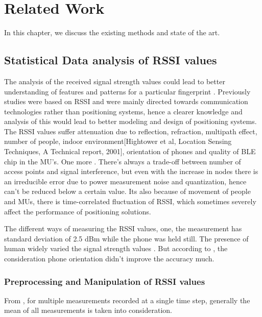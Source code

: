 \section{Related Work}
In this chapter, we discuss the existing methods and state of the art.

\subsection{Statistical Data analysis of RSSI values}
The analysis of the received signal strength values could lead to better understanding of features and patterns for a particular fingerprint . Previously studies were based on RSSI and were mainly directed towards communication technologies rather than positioning systems, hence a clearer knowledge and analysis of this would lead to better modeling and design of positioning systems\cite{kaemar}. The RSSI values suffer attenuation due to reflection, refraction, multipath effect, number of people, indoor environment[Hightower et al, Location Sensing Techniques, A Technical report, 2001], orientation of phones and quality of BLE chip in the MU's. One more  \cite{deluca}. There's always a trade-off between number of access points and signal interference, but even with the increase in nodes there is an irreducible error due to power measurement noise and quantization, hence can't be reduced below a certain value. Its also because of movement of people and MUs, there is time-correlated fluctuation of RSSI, which sometimes severely affect the performance of positioning solutions\cite{kaemar}.

The different ways of measuring the RSSI values, one, the measurement has standard deviation of 2.5 dBm while the phone was held still. The presence of human widely varied the signal strength values . But according to \cite{kaemar}, the consideration phone orientation didn't improve the accuracy much. 

\subsubsection{Preprocessing and Manipulation of RSSI values}
From \cite{honkavirta}, for multiple measurements recorded at a single time step, generally the mean of all measurements is taken into consideration.


